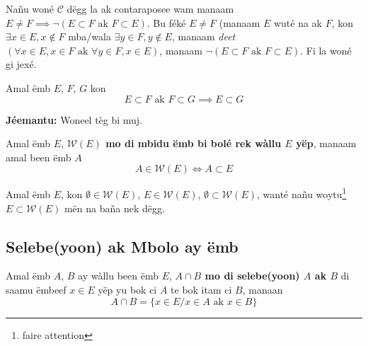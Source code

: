 \documentclass[twoside, a4paper]{article}
\begin{document}
Nañu woné $\mathcal{C}$ dëgg la ak contaraposee wam manaam $E \neq F \implies \neg (E \subset F \text{ ak } F \subset E)$. Bu féké $E \neq F$ (manaam $E$ wuté na ak $F$, kon $\exists x \in E, x \not\in F$ mba/wala $\exists y \in F, y \not\in E$, manaam \textit{deet}$(\forall x \in E, x \in F \text{ ak } \forall y \in F, x\in E)$, manaam $\neg (E \subset F \text{ ak } F \subset E)$. Fi la woné gi jexé.


\begin{tcolorbox}[enhanced jigsaw,breakable,pad at break*=1mm, colback=blue!5!white,colframe=white!75!black,title= Tèg\footnote{Proposition},
    watermark color=white]
  Amal ëmb $E$, $F$, $G$ kon
  $$E \subset F \text{ ak } F \subset G \implies E \subset G$$
\end{tcolorbox}
\textbf{Jéemantu:} Woneel tèg bi muj.

\begin{tcolorbox}[enhanced jigsaw,breakable,pad at break*=1mm, colback=red!5!white,colframe=white!75!black,title= Téeki,watermark color=white]
  Amal ëmb $E$, \textbf{$\mathcal{W}(E)$ mo di mbidu ëmb bi bolé rek wàllu $E$ yëp}, manaam amal been ëmb $A$
  $$A\in \mathcal{W}(E) \iff A \subset E$$
\end{tcolorbox}
Amal ëmb $E$, kon $\emptyset \in \mathcal{W}(E)$, $E \in \mathcal{W}(E)$, $\emptyset \subset \mathcal{W}(E)$, wanté nañu woytu\footnote{faire attention} $E \subset \mathcal{W}(E)$ mën na baña nek dëgg.


\subsection{Selebe(yoon) ak Mbolo ay ëmb}

\begin{tcolorbox}[enhanced jigsaw,breakable,pad at break*=1mm, colback=red!5!white,colframe=white!75!black,title= Téeki,watermark color=white]
  Amal ëmb $A$, $B$ ay wàllu been ëmb $E$, \textbf{$A\cap B$ mo di selebe(yoon) $A$ ak $B$} di saamu ëmbeef $x\in E$ yëp yu bok ci $A$ te bok itam ci $B$, manaan $$A\cap B = \big\{x \in E/ x \in A \text{ ak } x \in B\big\}$$
\end{tcolorbox}
\end{document}
